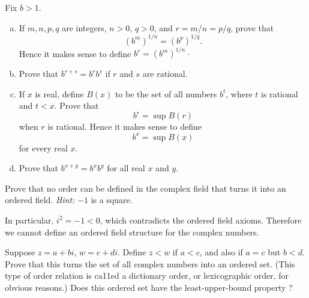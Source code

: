 \documentclass{zupan}
\begin{document}
\begin{exercise}{6}
  Fix $b > 1$.

  \begin{enumerate}[(a), noitemsep]
    \item If $m, n, p, q$ are integers, $n > 0$, $q > 0$, and $r = m/n = p/q$,
      prove that \[(b^m)^{1 / n} = (b^p)^{1 / q}.\] Hence it makes sense to
      define $b^r = (b^m)^{1 / n}$·
    \item Prove that $b^{r + s} = b^rb^s$ if $r$ and $s$ are rational.
    \item If $x$ is real, define $B(x)$ to be the set of all numbers $b^t$,
      where $t$ is rational and $t < x$. Prove that \[b^r = \sup{B(r)}\] when
      $r$ is rational. Hence it makes sense to define \[b^x = \sup{B(x)}\] for
      every real $x$.
    \item Prove that $b^{x + y} = b^xb^y$ for all real $x$ and $y$.
  \end{enumerate}
\end{exercise}

\begin{exercise}{8}
  Prove that no order can be defined in the complex field that turns it into an
  ordered field. \textit{Hint:} $-1$ is a square.
\end{exercise}

\begin{solution}
  In particular, $i^2 = -1 < 0$, which contradicts the ordered field axioms.
  Therefore we cannot define an ordered field structure for the complex
  numbers.
\end{solution}

\begin{exercise}{9}
  Suppose $z = a + bi$, $w = c + di$. Define $z < w$ if $a < c$, and also if $a
  = c$ but $b < d$. Prove that this turns the set of all complex numbers into
  an ordered set. (This type of order relation is ca11ed a dictionary order, or
  lexicographic order, for obvious reasons.) Does this ordered set have the
  least-upper-bound property ?
\end{exercise}
\end{document}
